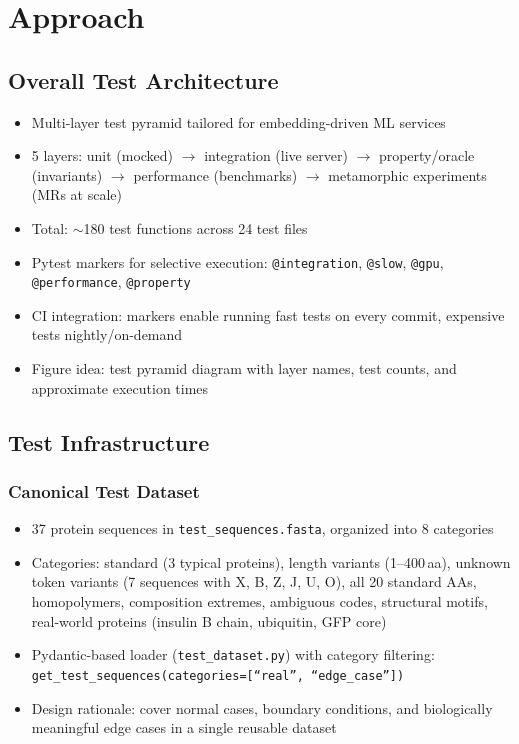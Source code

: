 
\chapter{Approach}\label{chapter:approach}


\section{Overall Test Architecture}\label{sec:test-architecture}
\begin{itemize}
  \item Multi-layer test pyramid tailored for embedding-driven ML services
  \item 5 layers: unit (mocked) $\to$ integration (live server) $\to$ property/oracle (invariants) $\to$ performance (benchmarks) $\to$ metamorphic experiments (MRs at scale)
  \item Total: $\sim$180 test functions across 24 test files
  \item Pytest markers for selective execution: \texttt{@integration}, \texttt{@slow}, \texttt{@gpu}, \texttt{@performance}, \texttt{@property}
  \item CI integration: markers enable running fast tests on every commit, expensive tests nightly/on-demand
  \item Figure idea: test pyramid diagram with layer names, test counts, and approximate execution times
\end{itemize}

\section{Test Infrastructure}\label{sec:test-infrastructure}

\subsection{Canonical Test Dataset}\label{sec:canonical-dataset}
\begin{itemize}
  \item 37 protein sequences in \texttt{test\_sequences.fasta}, organized into 8 categories
  \item Categories: standard (3 typical proteins), length variants (1--400\,aa), unknown token variants (7 sequences with X, B, Z, J, U, O), all 20 standard AAs, homopolymers, composition extremes, ambiguous codes, structural motifs, real-world proteins (insulin B chain, ubiquitin, GFP core)
  \item Pydantic-based loader (\texttt{test\_dataset.py}) with category filtering: \texttt{get\_test\_sequences(categories=[``real'', ``edge\_case''])}
  \item Design rationale: cover normal cases, boundary conditions, and biologically meaningful edge cases in a single reusable dataset
\end{itemize}

